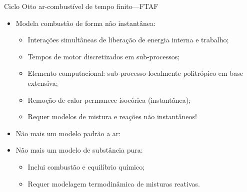     \begin{frame}{Ciclo Otto ar-combustível de tempo finito---FTAF}\vspace*{-2em}
        \begin{itemize}
            \item<1->  Modela combustão de forma \alert{não instantânea}:
            \begin{itemize}
                \item<2->  Interações \alert{simultâneas} de \alert{liberação de energia
                    interna} e \alert{trabalho};
                \item<3->  Tempos de motor \alert{discretizados} em \alert{sub-processos};
                \item<4->  Elemento computacional: sub-processo \alert{localmente politrópico}
                    em base \alert{extensiva};
                \item<5->  \alert{Remoção} de calor permanece \alert{isocórica} (instantânea);
                \item<6->  Requer modelos de mistura e reações \alert{não instantâneos}!
            \end{itemize}
            \item<7->  Não mais um modelo \alert{padrão a ar}:
            \item<8->  Não mais um modelo de \alert{substância pura}:
            \begin{itemize}
                \item<9->  Inclui \alert{combustão e equilíbrio químico};
                \item<10-> Requer modelagem termodinâmica de \alert{misturas reativas}.
            \end{itemize}
        \end{itemize}
    \end{frame}

